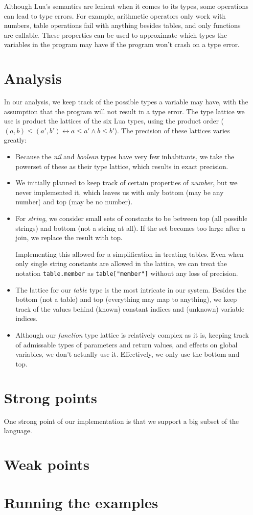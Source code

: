 \documentclass[a4paper]{article}
\begin{document}
Although Lua's semantics are lenient when it comes to its types, some operations
can lead to type errors. For example, arithmetic operators only work with numbers,
table operations fail with anything besides tables, and only functions are callable.
These properties can be used to approximate which types the variables in
the program may have if the program won't crash on a type error.

\section*{Analysis}

In our analysis, we keep track of the possible types a variable may have,
with the assumption that the program will not result in a type error.
The type lattice we use is product the lattices of the six Lua types, using the
product order ($(a,b) \leq (a',b') \leftrightarrow a \leq a' \wedge b \leq b'$).
The precision of these lattices varies greatly:

\begin{itemize}
\item Because the \textit{nil} and \textit{boolean} types have very few
    inhabitants, we take the powerset of these as their type lattice,
    which results in exact precision.
\item We initially planned to keep track of certain properties of
    \textit{number}, but we never implemented it, which leaves us with only
    bottom (may be any number) and top (may be no number).
\item For \textit{string}, we consider small sets of constants to be between
    top (all possible strings) and bottom (not a string at all). If the set
    becomes too large after a join, we replace the result with top.

    Implementing this allowed for a simplification in treating tables.
    Even when only single string constants are allowed in the lattice,
    we can treat the notation \texttt{table.member} as \texttt{table["member"]}
    without any loss of precision.
\item The lattice for our \textit{table} type is the most intricate in our
    system. Besides the bottom (not a table) and top (everything may map to
    anything), we keep track of the values behind (known) constant indices and
    (unknown) variable indices.
\item Although our \textit{function} type lattice is relatively complex as it
    is, keeping track of admissable types of parameters and return values, and
    effects on global variables, we don't actually use it. Effectively,
    we only use the bottom and top.
\end{itemize}

\section*{Strong points}

One strong point of our implementation is that we support a big subset of the language.


\section*{Weak points}

\section*{Running the examples}
\end{document}
